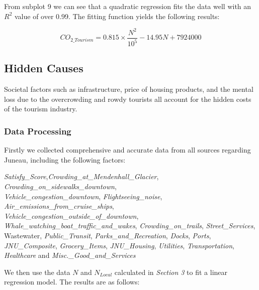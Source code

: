 \begin{figure}[H]
\begin{minipage}{0.33\textwidth}
    \end{minipage}
\end{figure}

From subplot 9 we can see that a quadratic regression 
fits the data well with an $R^2$ value of over 0.99.
The fitting function yields the following results:

\begin{equation}
    CO_{2\_Tourism} = 0.815 \times \frac{N^2}{10^5} - 14.95N+7924000
\end{equation}



\subsection{Hidden Causes}

Societal factors such as infrastructure, price of housing products, and the mental
loss due to the overcrowding and rowdy tourists all account for the hidden costs of the tourism industry.

\subsubsection{Data Processing}

Firstly we collected comprehensive and accurate data from all sources regarding Juneau, including the following factors:

\textit{Satisfy\_Score},\textit{Crowding\_at\_Mendenhall\_Glacier}, \textit{Crowding\_on\_sidewalks\_downtown}, \\ \textit{Vehicle\_congestion\_downtown}, \textit{Flightseeing\_noise}, \textit{Air\_emissions\_from\_cruise\_ships},\\ \textit{Vehicle\_congestion\_outside\_of\_downtown}, 
\textit{Whale\_watching\_boat\_traffic\_and\_wakes}, \textit{Crowding\_on\_trails}, \textit{Street\_Services}, Wastewater, \textit{Public\_Transit}, \textit{Parks\_and\_Recreation}, 
\textit{Docks}, \textit{Ports}, \textit{JNU\_Composite}, \textit{Grocery\_Items}, \textit{JNU\_Housing}, \textit{Utilities}, \textit{Transportation}, \textit{Healthcare} and \textit{Misc.\_Good\_and\_Services}

We then use the data $N$ and $N_{Local}$ calculated in \textit{Section 3} to fit a linear regression model. The results are as follows:

